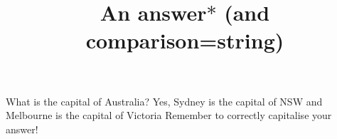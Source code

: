 \documentclass[hidesidemenu]{webquiz}
\title{An answer$*$ (and comparison=string)}
\begin{document}
  \begin{question}     %
     What is the capital of Australia?
     \whenRight  Yes, Sydney is the capital of NSW and Melbourne is the
     capital of Victoria
     \whenWrong Remember to correctly capitalise your answer!
  \end{question}
\end{document}
